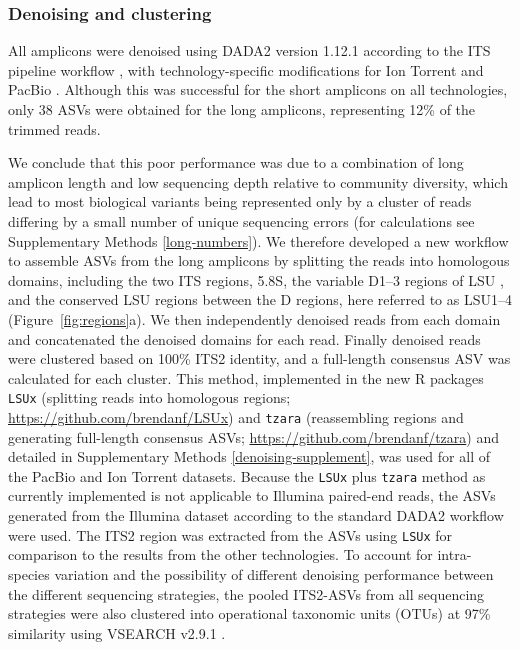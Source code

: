 \documentclass[
  12pt,
]{article}
\begin{document}
\hypertarget{denoising-and-clustering}{%
\subsubsection{Denoising and clustering}\label{denoising-and-clustering}}

All amplicons were denoised using DADA2 version 1.12.1 according to the ITS pipeline workflow \autocite{callahan2016,callahan2020}, with technology-specific modifications for Ion Torrent \autocite{callahan2020b} and PacBio \autocite{callahan2019}.
Although this was successful for the short amplicons on all technologies, only 38 ASVs were obtained for the long amplicons, representing 12\% of the trimmed reads.

We conclude that this poor performance was due to a combination of long amplicon length and low sequencing depth relative to community diversity, which lead to most biological variants being represented only by a cluster of reads differing by a small number of unique sequencing errors (for calculations see Supplementary Methods \ref{long-numbers}).
We therefore developed a new workflow to assemble ASVs from the long amplicons by splitting the reads into homologous domains, including the two ITS regions, 5.8S, the variable D1--3 regions of LSU \autocite{michot1984}, and the conserved LSU regions between the D regions, here referred to as LSU1--4 (Figure~\ref{fig:regions}a).
We then independently denoised reads from each domain and concatenated the denoised domains for each read.
Finally denoised reads were clustered based on 100\% ITS2 identity, and a full-length consensus ASV was calculated for each cluster.
This method, implemented in the new R packages \texttt{LSUx} (splitting reads into homologous regions; \url{https://github.com/brendanf/LSUx}) and \texttt{tzara} (reassembling regions and generating full-length consensus ASVs; \url{https://github.com/brendanf/tzara}) and detailed in Supplementary Methods \ref{denoising-supplement}, was used for all of the PacBio and Ion Torrent datasets.
Because the \texttt{LSUx} plus \texttt{tzara} method as currently implemented is not applicable to Illumina paired-end reads, the ASVs generated from the Illumina dataset according to the standard DADA2 workflow were used.
The ITS2 region was extracted from the ASVs using \texttt{LSUx} for comparison to the results from the other technologies.
To account for intra-species variation and the possibility of different denoising performance between the different sequencing strategies, the pooled ITS2-ASVs from all sequencing strategies were also clustered into operational taxonomic units (OTUs) at 97\% similarity using VSEARCH v2.9.1 \autocite{rognes2016}.
\end{document}
